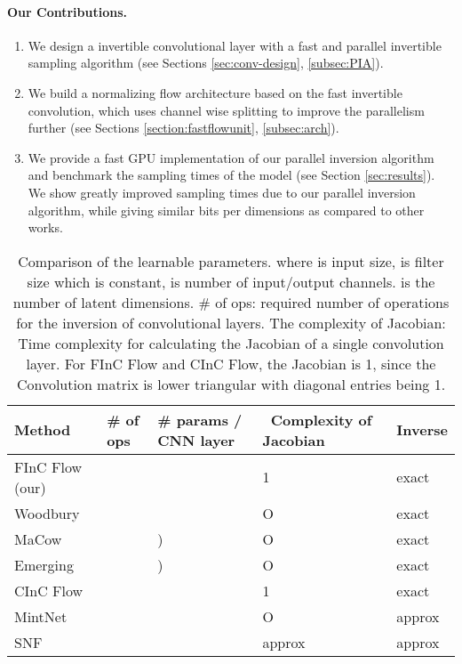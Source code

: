 \documentclass[a4paper,twoside]{article}
\theoremstyle{definition}
\begin{document}
\paragraph{Our Contributions.}
\begin{enumerate}
    \item We design a  invertible convolutional layer with a fast and parallel invertible sampling algorithm (see Sections \ref{sec:conv-design}, \ref{subsec:PIA}).
    \item We build a normalizing flow architecture based on the fast invertible convolution, which uses channel wise splitting to improve the parallelism further (see Sections \ref{section:fastflowunit}, \ref{subsec:arch}).
    \item We provide a fast GPU implementation of our parallel inversion algorithm and benchmark the sampling times of the model (see Section \ref{sec:results}). We show greatly improved sampling times due to our parallel inversion algorithm, while giving similar bits per dimensions as compared to other works.
\end{enumerate}
 
\begin{table*}[!t]
    \centering
    \begin{tabular}{l  l  l  l  l }
        \toprule
        Method    & \# of ops & \# params / CNN layer & \ Complexity of Jacobian & Inverse\\ 
        \midrule
        FInC Flow (our)  &     &     & 1 &     exact   \\
        Woodbury \citep{lu2020woodbury} &  &  & O & exact \\
        MaCow \citep{ma2019macow}     &     & ) &  O & exact\\ 
        Emerging \citep{hoogeboom2019emerging}  &   &  )  &  O  &    exact   \\
        CInC Flow \citep{nagar2021cinc}  &     &     & 1  &   exact      \\
        \midrule
        MintNet   \citep{song2019mintnet} &     &     &  O &    approx  \\ 
        SNF  \citep{keller2021self} &      &    &  approx &  approx \\ \bottomrule
    \end{tabular}
    \caption{Comparison of the learnable parameters. where  is input size,  is filter size which is constant,  is number of input/output channels.  is the number of latent dimensions. \# of ops: required number of operations for the inversion of convolutional layers. The complexity of Jacobian: Time complexity for calculating the Jacobian of a single convolution layer. For FInC Flow and CInC Flow, the Jacobian is 1, since the Convolution matrix is lower triangular with diagonal entries being 1.}
    \label{table:complexity}
\end{table*}
\end{document}
